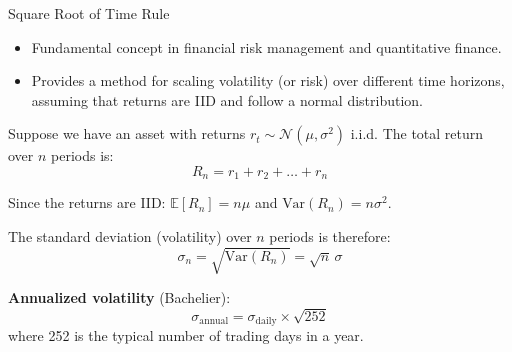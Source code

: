 \documentclass[9pt, aspectratio=169, t]{beamer}
\theoremstyle{definition}
\newcommand{\E}{\mathbb{E}}
\newcommand{\Var}{\text{Var}}
\begin{document}
\begin{frame}{Square Root of Time Rule}

\begin{itemize}
    \item Fundamental concept in financial risk management and quantitative finance.
    \item Provides a method for scaling volatility (or risk) over different time horizons, assuming that returns are IID and follow a normal distribution.
\end{itemize}

\vspace{0.2cm}

Suppose we have an asset with returns $r_t \sim \mathcal{N}(\mu, \sigma^2)$ i.i.d. The total return over $n$ periods is:
\[
R_n = r_1 + r_2 + \ldots + r_n
\]

Since the returns are IID: $\E[R_n] = n\mu$ and $\Var(R_n) = n\sigma^2$.

\vspace{0.2cm}

The standard deviation (volatility) over $n$ periods is therefore:
\[
\sigma_n = \sqrt{\Var(R_n)} = \sqrt{n}\,\sigma
\]

\vspace{0.2cm}

\textbf{Annualized volatility} (Bachelier):
\[
\boxed{\sigma_{\text{annual}} = \sigma_{\text{daily}} \times \sqrt{252}}
\]
where 252 is the typical number of trading days in a year.

\end{frame}
\end{document}
